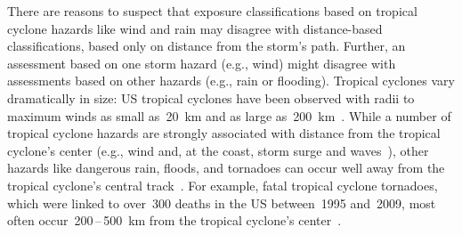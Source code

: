 

 
There are reasons to suspect that exposure classifications based on tropical
cyclone hazards like wind and rain may disagree with distance-based
classifications, based only on distance from the storm's path. Further, an
assessment based on one storm hazard (e.g., wind) might disagree with assessments based on
other hazards (e.g., rain or flooding).
Tropical cyclones vary dramatically in size: \ac{US} tropical cyclones have
been observed with radii to maximum winds as small as~20~\si{\kilo\metre} and
as large as~200~\si{\kilo\metre}~\parencite{mallin2006, quiring2011variations}.
While a number of tropical cyclone hazards are strongly associated with
distance from the tropical cyclone's center (e.g., wind and, at the coast,
storm surge and waves~\parencite{rappaport2000, kruk2010}), other hazards like
dangerous rain, floods, and tornadoes can occur well away from the tropical
cyclone's central track~\parencite{rappaport2000, atallah2007, moore2012}.  For
example, fatal tropical cyclone tornadoes, which were linked to over~300 deaths
in the \ac{US} between~1995 and~2009, most often
occur~200\,--\,500~\si{\kilo\metre} from the tropical cyclone's
center~\parencite{moore2012}. 

